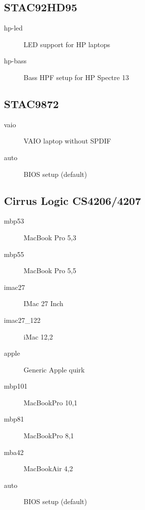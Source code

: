 \documentclass[a4paper,8pt,english]{sphinxmanual}
\begin{document}
\subsection{STAC92HD95}
\label{sound/hd-audio/models:stac92hd95}\begin{description}
\item[{hp-led}] \leavevmode
LED support for HP laptops

\item[{hp-bass}] \leavevmode
Bass HPF setup for HP Spectre 13

\end{description}


\subsection{STAC9872}
\label{sound/hd-audio/models:stac9872}\begin{description}
\item[{vaio}] \leavevmode
VAIO laptop without SPDIF

\item[{auto}] \leavevmode
BIOS setup (default)

\end{description}


\subsection{Cirrus Logic CS4206/4207}
\label{sound/hd-audio/models:cirrus-logic-cs4206-4207}\begin{description}
\item[{mbp53}] \leavevmode
MacBook Pro 5,3

\item[{mbp55}] \leavevmode
MacBook Pro 5,5

\item[{imac27}] \leavevmode
IMac 27 Inch

\item[{imac27\_122}] \leavevmode
iMac 12,2

\item[{apple}] \leavevmode
Generic Apple quirk

\item[{mbp101}] \leavevmode
MacBookPro 10,1

\item[{mbp81}] \leavevmode
MacBookPro 8,1

\item[{mba42}] \leavevmode
MacBookAir 4,2

\item[{auto}] \leavevmode
BIOS setup (default)

\end{description}
\end{document}
